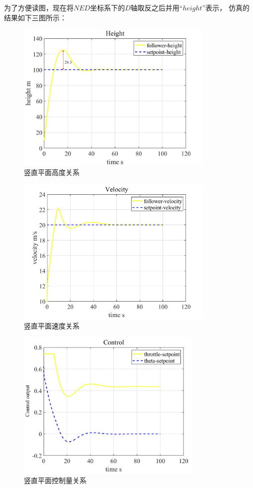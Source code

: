 为了方便读图，现在将$NED$坐标系下的$D$轴取反之后并用“$height$”表示，
仿真的结果如下三图所示：
\begin{figure}[H]
    \centering
    \includegraphics[width=0.85\textwidth]{figures/c5/c5-TECS-height.jpg}
    \caption{竖直平面高度关系}\label{fig:c5-TECS-height}
\end{figure}
\begin{figure}[H]
    \centering
    \includegraphics[width=0.85\textwidth]{figures/c5/c5-TECS-vel.jpg}
    \caption{竖直平面速度关系}\label{fig:c5-TECS-vel}
\end{figure}
\begin{figure}[H]
    \centering
    \includegraphics[width=0.80\textwidth]{figures/c5/update/control_output}
    \caption{竖直平面控制量关系}\label{fig:c5-TECS-control}
\end{figure}
